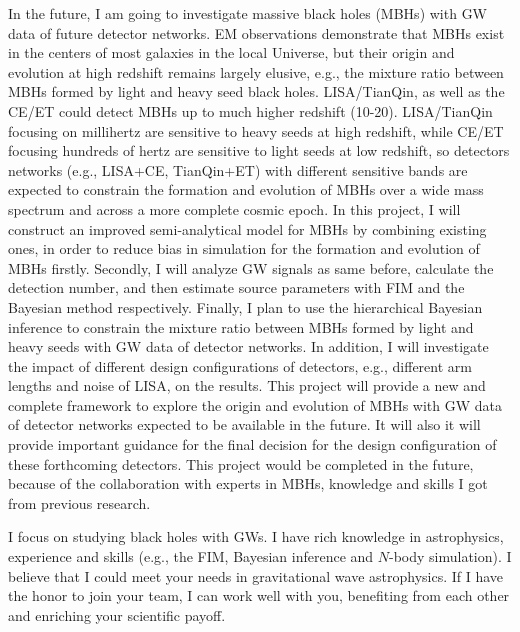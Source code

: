 \documentclass[12pt,a4paper,sans]{article}%
\begin{document}
In the future, I am going to investigate massive black holes (MBHs) with GW data of future detector networks. EM observations demonstrate that MBHs exist in the centers of most
galaxies in the local Universe, but their origin and evolution at high redshift remains largely
elusive, e.g., the mixture ratio between MBHs formed by light and heavy seed black holes. LISA/TianQin, as well as the
CE/ET could detect MBHs up to much higher
redshift (10-20). LISA/TianQin focusing on millihertz are sensitive to heavy seeds at high redshift, while CE/ET focusing
hundreds of hertz are sensitive to light seeds at low redshift, so detectors networks (e.g., LISA+CE, TianQin+ET) with different sensitive bands are expected to
constrain the formation and evolution of MBHs over a wide mass spectrum and across a more complete cosmic
epoch. In this project, I will construct an improved semi-analytical model for MBHs by combining
existing ones, in order to reduce bias in simulation for the formation and evolution of MBHs firstly.
Secondly, I will analyze GW signals as same before, calculate the detection number, and then estimate source parameters
with FIM and the
Bayesian method respectively. Finally, I plan to use the hierarchical Bayesian inference to constrain the mixture ratio
between MBHs formed by light and heavy seeds with GW data of detector networks. In addition, I will investigate the
impact of different design configurations of
detectors, e.g., different arm lengths and noise of LISA, on the results. This project will provide a new and complete framework to explore the
origin and evolution of MBHs with GW data of detector networks expected to be
available in the future. It will also it will provide important guidance for the final decision for the design
configuration of these forthcoming detectors. This project would be completed in the future, because of the
collaboration with experts in MBHs, knowledge
and skills I got from previous research.

I focus on studying black holes with GWs. I have rich knowledge in astrophysics, experience and skills (e.g., the FIM, Bayesian
inference and $N$-body simulation). I believe that I could meet your needs in gravitational wave astrophysics. If I have the honor to join your team, I can work well with you, benefiting from each other and enriching your scientific payoff. 
\end{document}
